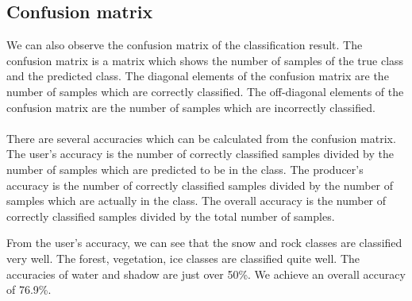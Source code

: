 \documentclass[12pt
,headinclude
,headsepline
,bibtotocnumbered
]{scrartcl}
\begin{document}
\subsection*{Confusion matrix}
We can also observe the confusion matrix of the classification result. The confusion matrix is a matrix which shows the number of samples of the true class and the predicted class. The diagonal elements of the confusion matrix are the number of samples which are correctly classified. The off-diagonal elements of the confusion matrix are the number of samples which are incorrectly classified.
\\\\
There are several accuracies which can be calculated from the confusion matrix. The user's accuracy is the number of correctly classified samples divided by the number of samples which are predicted to be in the class. The producer's accuracy is the number of correctly classified samples divided by the number of samples which are actually in the class. The overall accuracy is the number of correctly classified samples divided by the total number of samples.
\begin{table}[H]
    \renewcommand\arraystretch{1.5}
\end{table}
From the user's accuracy, we can see that the snow and rock classes are classified very well. The forest, vegetation, ice classes are classified quite well. The accuracies of water and shadow are just over 50\%. We achieve an overall accuracy of 76.9\%. 
\end{document}
